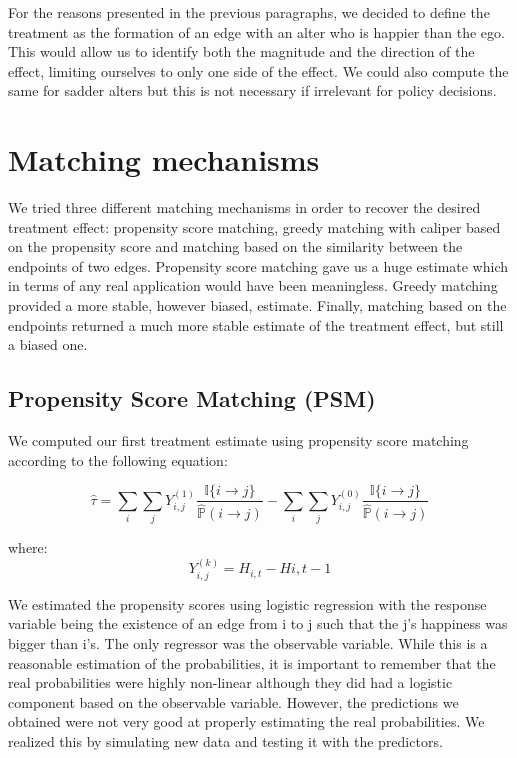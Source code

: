 \documentclass[11pt]{article}
\begin{document}
For the reasons presented in the previous paragraphs, we decided to define the treatment as the formation of an edge with an alter who is happier than the ego. This would allow us to identify both the magnitude and the direction of the effect, limiting ourselves to only one side of the effect. We could also compute the same for sadder alters but this is not necessary if irrelevant for policy decisions. 

\section{Matching mechanisms}
\label{Matching Mechanisms}
We tried three different matching mechanisms in order to recover the desired treatment effect: propensity score matching, greedy matching with caliper based on the propensity score and matching based on the similarity between the endpoints of two edges. Propensity score matching gave us a huge estimate which in terms of any real application would have been meaningless. Greedy matching provided a more stable, however biased, estimate. Finally, matching based on the endpoints returned a much more stable estimate of the treatment effect, but still a biased one. 

\subsection{Propensity Score Matching (PSM)}

We computed our first treatment estimate using propensity score matching according to the following equation:

$$\hat{\tau} = \sum\limits_i\sum\limits_j Y_{i,j}^{(1)}\frac{\mathbb{I}\{i \rightarrow j\}}{\hat{\mathbb{P}}(i\rightarrow j)} - \sum\limits_i\sum\limits_j Y_{i,j}^{(0)}\frac{\mathbb{I}\{i \rightarrow j\}}{\hat{\mathbb{P}}(i\rightarrow j)}$$

where:
$$Y_{i,j}^(k) = H_{i,t}-H{i,t-1}$$

We estimated the propensity scores using logistic regression with the response variable being the existence of an edge from i to j such that the j's happiness was bigger than i's. The only regressor was the observable variable. While this is a reasonable estimation of the probabilities, it is important to remember that the real probabilities were highly non-linear although they did had a logistic component based on the observable variable. However, the predictions we obtained were not very good at properly estimating the real probabilities. We realized this by simulating new data and testing it with the predictors. 
\end{document}
